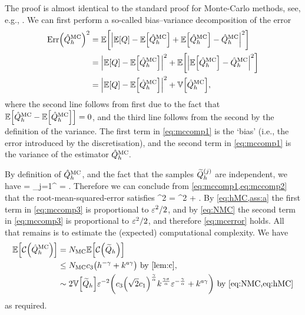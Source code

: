 The proof is almost identical to the standard proof for Monte-Carlo methods, see, e.g., \cite[Section 2.1]{ClGiScTe:11}. We can first perform a so-called bias--variance decomposition of the error
\begin{align}
\err{\QhatMC}^2 &=  \EXP{ \abs{\EXP{Q}-\EXP{\QhatMC} + \EXP{\QhatMC} - \QhatMC}^2} \nonumber\\
&= \abs{\EXP{Q}-\EXP{\QhatMC}}^2 + \EXP{\abs{\EXP{\QhatMC} - \QhatMC}^2} \nonumber\\
&= \abs{\EXP{Q} - \EXP{\QhatMC}}^2+\VAR{\QhatMC},\label{eq:mccomp1}
\end{align}
where the second line follows from first due to the fact that $\EXP{\QhatMC - \EXP{\QhatMC}} = 0$, and the third line follows from the second by the definition of the variance. The first term in \cref{eq:mccomp1} is the `bias' (i.e., the error introduced by the discretisation), and the second term in \cref{eq:mccomp1} is the variance of the estimator $\hat{Q}^{\mathrm{MC}}_{h}.$

By definition of $\hat{Q}^{\mathrm{MC}}_{h}$, and the fact that the samples $\widetilde{Q}_{h}^{(j)}$ are independent, we have
\beq\label{eq:mccomp2}
\VAR{\QhatMC} = \sum_{j=1}^{\NMC}\VAR{\Qhtildesj} =  \VAR{\Qhtilde}.
\eeq
Therefore we can conclude from \cref{eq:mccomp1,eq:mccomp2} that the root-mean-squared-error satisfies
\beq\label{eq:mccomp3}
\err{\QhatMC}^2 = ^2 + \VAR{\Qhtilde}.
\eeq
By \cref{eq:hMC,ass:a} the first term in \cref{eq:mccomp3} is proportional to $\varepsilon^2/2$, and by \cref{eq:NMC} the second term in \cref{eq:mccomp3} is proportional to $\varepsilon^2/2$, and therefore \cref{eq:mcerror} holds. All that remains is to estimate the (expected) computational complexity. We have
\begin{align*}
  \EXP{\Cost{\QhatMC}} &= \NMC \EXP{\Cost{\Qhtilde}}\\
  &\leq \NMC \cth \mleft(h^{-\gamma} + k^{a\gamma}\mright) \text{ by \cref{lem:c},}\\
  &\sim 2\VAR{\Qhtilde}\eps^{-2} \mleft(\cth \mleft(\sqrt{2} \co\mright)^{\frac\gamma\alpha}k^{\frac{\gamma\sigma}{\alpha}}\eps^{-\frac\gamma\alpha} + k^{a\gamma}\mright)\text{ by \cref{eq:NMC,eq:hMC}}
\end{align*}
as required.
\epf

